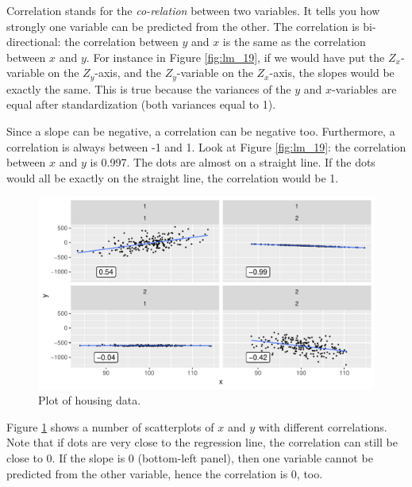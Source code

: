 \documentclass[]{report}\usepackage[]{graphicx}\usepackage[]{color}
\makeatletter
\def\maxwidth{ %
  \ifdim\Gin@nat@width>\linewidth
    \linewidth
  \else
    \Gin@nat@width
  \fi
}
\newenvironment{knitrout}{}{} %
\makeatother
\begin{document}
Correlation stands for the \textit{co-relation} between two variables. It tells you how strongly one variable can be predicted from the other. The correlation is bi-directional: the correlation between $y$ and $x$ is the same as the correlation between $x$ and $y$. For instance in Figure \ref{fig:lm_19}, if we would have put the $Z_x$-variable on the $Z_y$-axis, and the $Z_y$-variable on the $Z_x$-axis, the slopes would be exactly the same. This is true because the variances of the $y$ and $x$-variables are equal after standardization (both variances equal to 1).

Since a slope can be negative, a correlation can be negative too. Furthermore, a correlation is always between -1 and 1. Look at Figure \ref{fig:lm_19}: the correlation between $x$ and $y$ is 0.997. The dots are almost on a straight line. If the dots would all be exactly on the straight line, the correlation would be 1.

\begin{knitrout}
\color{fgcolor}\begin{figure}

{\centering \includegraphics[width=\maxwidth]{figure/lm_20-1} 

}

\caption[Plot of housing data]{Plot of housing data.}\label{fig:lm_20}
\end{figure}


\end{knitrout}


Figure \ref{fig:lm_20} shows a number of scatterplots of $x$ and $y$ with different correlations. Note that if dots are very close to the regression line, the correlation can still be close to 0. If the slope is 0 (bottom-left panel), then one variable cannot be predicted from the other variable, hence the correlation is 0, too.
\end{document}
